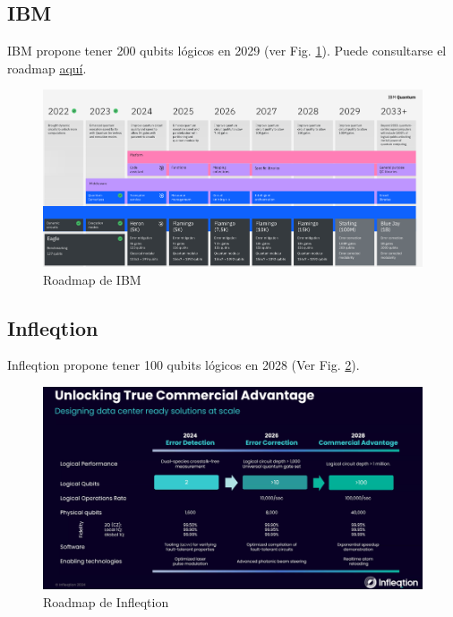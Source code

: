 \subsection{IBM}

IBM propone tener 200 qubits lógicos en 2029 (ver Fig. \ref{Fig_Hardware_ibm_roadmap}). Puede consultarse el roadmap \href{https://www.ibm.com/quantum/technology}{aquí}.

	\begin{figure}[H]
	\centering 
	\includegraphics[width=1\linewidth]{Figuras/Fig_Hardware_ibm_roadmap.png}
	\caption{Roadmap de IBM}
	\label{Fig_Hardware_ibm_roadmap}
	\end{figure}

\subsection{Infleqtion}

Infleqtion propone tener 100 qubits lógicos en 2028 (Ver Fig. \ref{Fig_Hardware_infleqtion_roadmap}).

	\begin{figure}[H]
	\centering 
	\includegraphics[width=1\linewidth]{Figuras/Fig_Hardware_infleqtion_roadmap.png}
	\caption{Roadmap de Infleqtion}
	\label{Fig_Hardware_infleqtion_roadmap}
	\end{figure}

